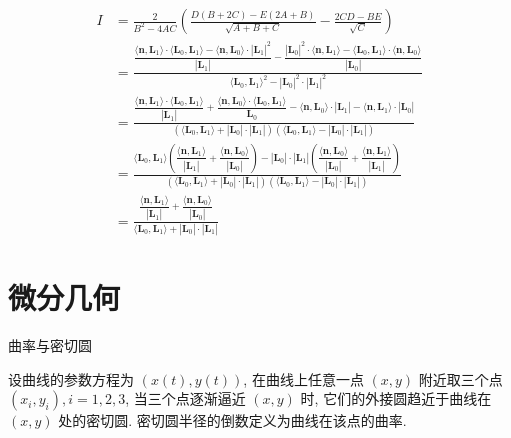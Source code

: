 \begin{align*}
I &= \frac{2}{B^2-4AC}\left(\frac{D(B + 2C) - E(2A+B)}{\sqrt{A+B+C}} - \frac{2CD - BE}{\sqrt{C}}\right)\\
&= \frac{ \dfrac{\langle\mathbf{n},\mathbf{L}_1\rangle\cdot\langle\mathbf{L}_0,\mathbf{L}_1\rangle - \langle\mathbf{n},\mathbf{L}_0\rangle\cdot|\mathbf{L}_1|^2}{|\mathbf{L}_1|} - \dfrac{|\mathbf{L}_0|^2\cdot\langle\mathbf{n},\mathbf{L}_1\rangle - \langle\mathbf{L}_0,\mathbf{L}_1\rangle\cdot\langle\mathbf{n},\mathbf{L}_0\rangle}{|\mathbf{L}_0|} }{\langle\mathbf{L}_0,\mathbf{L}_1\rangle^2-|\mathbf{L}_0|^2\cdot|\mathbf{L}_1|^2}\\
&= \frac{  \dfrac{\langle\mathbf{n},\mathbf{L}_1\rangle\cdot\langle\mathbf{L}_0,\mathbf{L}_1\rangle}{|\mathbf{L}_1|} + \dfrac{\langle\mathbf{n},\mathbf{L}_0\rangle\cdot\langle\mathbf{L}_0,\mathbf{L}_1\rangle}{\mathbf{L}_0} - \langle\mathbf{n},\mathbf{L}_0\rangle\cdot|\mathbf{L}_1| - \langle\mathbf{n},\mathbf{L}_1\rangle\cdot|\mathbf{L}_0|}{(\langle\mathbf{L}_0,\mathbf{L}_1\rangle+|\mathbf{L}_0|\cdot|\mathbf{L}_1|)(\langle\mathbf{L}_0,\mathbf{L}_1\rangle-|\mathbf{L}_0|\cdot|\mathbf{L}_1|)} \\
&= \frac{\langle\mathbf{L}_0,\mathbf{L}_1\rangle\left(\dfrac{\langle\mathbf{n},\mathbf{L}_1\rangle}{|\mathbf{L}_1|}+\dfrac{\langle\mathbf{n},\mathbf{L}_0\rangle}{|\mathbf{L}_0|}\right) - |\mathbf{L}_0|\cdot|\mathbf{L}_1|\left(\dfrac{\langle\mathbf{n},\mathbf{L}_0\rangle}{|\mathbf{L}_0|}+\dfrac{\langle\mathbf{n},\mathbf{L}_1\rangle}{|\mathbf{L}_1|}\right)}{(\langle\mathbf{L}_0,\mathbf{L}_1\rangle+|\mathbf{L}_0|\cdot|\mathbf{L}_1|)(\langle\mathbf{L}_0,\mathbf{L}_1\rangle-|\mathbf{L}_0|\cdot|\mathbf{L}_1|)} \\
&= \frac{\dfrac{\langle\mathbf{n},\mathbf{L}_1\rangle}{|\mathbf{L}_1|}+\dfrac{\langle\mathbf{n},\mathbf{L}_0\rangle}{|\mathbf{L}_0|} }{\langle\mathbf{L}_0,\mathbf{L}_1\rangle + |\mathbf{L}_0|\cdot|\mathbf{L}_1|}
\end{align*}


\newpage
\section{微分几何}
\noindent 曲率与密切圆

设曲线的参数方程为 $(x(t), y(t))$, 在曲线上任意一点 $(x,y)$ 附近取三个点 $(x_i, y_i), i=1,2,3$, 当三个点逐渐逼近 $(x,y)$ 时, 它们的外接圆趋近于曲线在 $(x,y)$ 处的密切圆. 密切圆半径的倒数定义为曲线在该点的曲率.
\begin{figure*}[htbp]
\centering
{}
\end{figure*}

